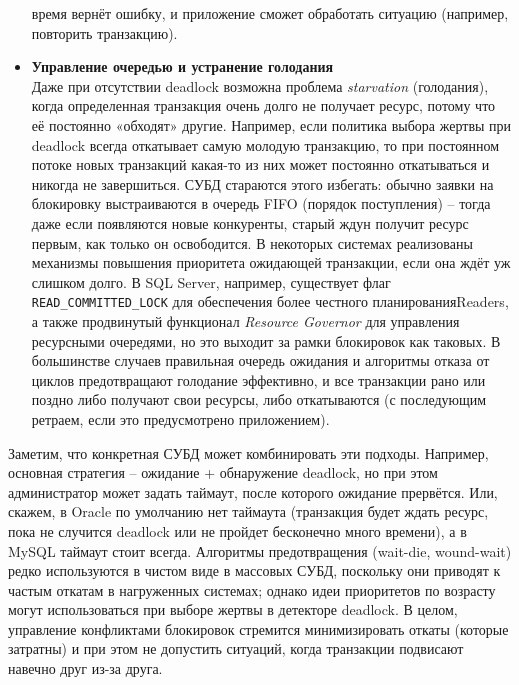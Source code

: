 \begin{itemize}
время вернёт ошибку, и приложение сможет обработать ситуацию (например, повторить транзакцию). 
    \item \textbf{Управление очередью и устранение голодания} ~\\
    Даже при отсутствии deadlock возможна проблема \textit{starvation} (голодания), когда определенная транзакция очень долго не получает ресурс, потому что её постоянно «обходят» другие. Например, если политика выбора жертвы при deadlock всегда откатывает самую молодую транзакцию, то при постоянном потоке новых транзакций какая-то из них может постоянно откатываться и никогда не завершиться. СУБД стараются этого избегать: обычно заявки на блокировку выстраиваются в очередь FIFO (порядок поступления) – тогда даже если появляются новые конкуренты, старый ждун получит ресурс первым, как только он освободится. В некоторых системах реализованы механизмы повышения приоритета ожидающей транзакции, если она ждёт уж слишком долго. В SQL Server, например, существует флаг \texttt{READ\_COMMITTED\_LOCK} для обеспечения более честного планированияReaders, а также продвинутый функционал \textit{Resource Governor} для управления ресурсными очередями, но это выходит за рамки блокировок как таковых. В большинстве случаев правильная очередь ожидания и алгоритмы отказа от циклов предотвращают голодание эффективно, и все транзакции рано или поздно либо получают свои ресурсы, либо откатываются (с последующим ретраем, если это предусмотрено приложением).
 \end{itemize} 
 Заметим, что конкретная СУБД может комбинировать эти подходы. Например, основная стратегия – ожидание + обнаружение deadlock, но при этом администратор может задать таймаут, после которого ожидание прервётся. Или, скажем, в Oracle по умолчанию нет таймаута (транзакция будет ждать ресурс, пока не случится deadlock или не пройдет бесконечно много времени), а в MySQL таймаут стоит всегда. Алгоритмы предотвращения (wait-die, wound-wait) редко используются в чистом виде в массовых СУБД, поскольку они приводят к частым откатам в нагруженных системах; однако идеи приоритетов по возрасту могут использоваться при выборе жертвы в детекторе deadlock. В целом, управление конфликтами блокировок стремится минимизировать откаты (которые затратны) и при этом не допустить ситуаций, когда транзакции подвисают навечно друг из-за друга.

